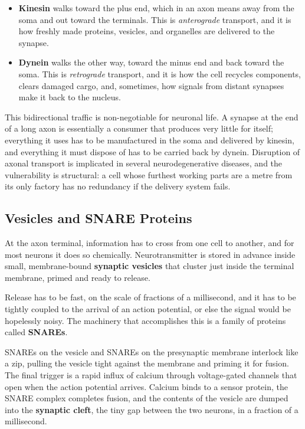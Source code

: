 \documentclass[11pt]{article}
\begin{document}
\begin{itemize}
    \item \textbf{Kinesin} walks toward the plus end, which in an axon means away from the soma and out toward the terminals. This is \textit{anterograde} transport, and it is how freshly made proteins, vesicles, and organelles are delivered to the synapse.
    \item \textbf{Dynein} walks the other way, toward the minus end and back toward the soma. This is \textit{retrograde} transport, and it is how the cell recycles components, clears damaged cargo, and, sometimes, how signals from distant synapses make it back to the nucleus.
\end{itemize}

This bidirectional traffic is non-negotiable for neuronal life. A synapse at the end of a long axon is essentially a consumer that produces very little for itself; everything it uses has to be manufactured in the soma and delivered by kinesin, and everything it must dispose of has to be carried back by dynein. Disruption of axonal transport is implicated in several neurodegenerative diseases, and the vulnerability is structural: a cell whose furthest working parts are a metre from its only factory has no redundancy if the delivery system fails.

\subsection{Vesicles and SNARE Proteins}

At the axon terminal, information has to cross from one cell to another, and for most neurons it does so chemically. Neurotransmitter is stored in advance inside small, membrane-bound \textbf{synaptic vesicles} that cluster just inside the terminal membrane, primed and ready to release.

Release has to be fast, on the scale of fractions of a millisecond, and it has to be tightly coupled to the arrival of an action potential, or else the signal would be hopelessly noisy. The machinery that accomplishes this is a family of proteins called \textbf{SNAREs}.

SNAREs on the vesicle and SNAREs on the presynaptic membrane interlock like a zip, pulling the vesicle tight against the membrane and priming it for fusion. The final trigger is a rapid influx of calcium through voltage-gated channels that open when the action potential arrives. Calcium binds to a sensor protein, the SNARE complex completes fusion, and the contents of the vesicle are dumped into the \textbf{synaptic cleft}, the tiny gap between the two neurons, in a fraction of a millisecond.
\end{document}

